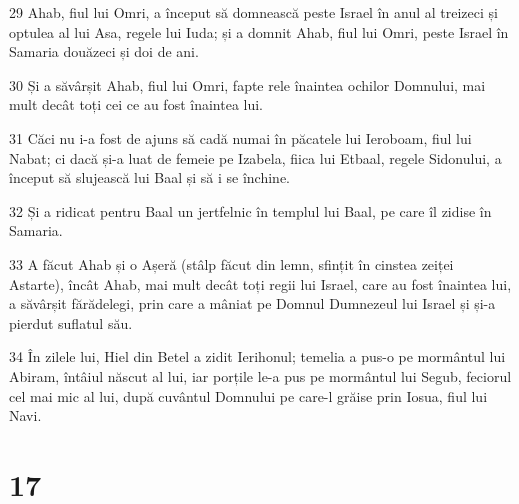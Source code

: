 \par 29 Ahab, fiul lui Omri, a început să domnească peste Israel în anul al treizeci și optulea al lui Asa, regele lui Iuda; și a domnit Ahab, fiul lui Omri, peste Israel în Samaria douăzeci și doi de ani.
\par 30 Și a săvârșit Ahab, fiul lui Omri, fapte rele înaintea ochilor Domnului, mai mult decât toți cei ce au fost înaintea lui.
\par 31 Căci nu i-a fost de ajuns să cadă numai în păcatele lui Ieroboam, fiul lui Nabat; ci dacă și-a luat de femeie pe Izabela, fiica lui Etbaal, regele Sidonului, a început să slujească lui Baal și să i se închine.
\par 32 Și a ridicat pentru Baal un jertfelnic în templul lui Baal, pe care îl zidise în Samaria.
\par 33 A făcut Ahab și o Așeră (stâlp făcut din lemn, sfințit în cinstea zeiței Astarte), încât Ahab, mai mult decât toți regii lui Israel, care au fost înaintea lui, a săvârșit fărădelegi, prin care a mâniat pe Domnul Dumnezeul lui Israel și și-a pierdut suflatul său.
\par 34 În zilele lui, Hiel din Betel a zidit Ierihonul; temelia a pus-o pe mormântul lui Abiram, întâiul născut al lui, iar porțile le-a pus pe mormântul lui Segub, feciorul cel mai mic al lui, după cuvântul Domnului pe care-l grăise prin Iosua, fiul lui Navi.

\chapter{17}


